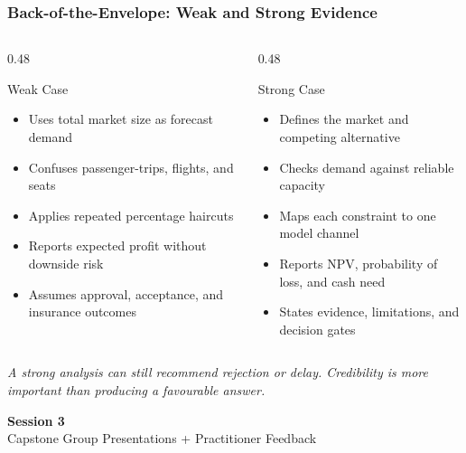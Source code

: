 \documentclass{beamer}
\begin{document}
\begin{frame}[t,shrink=13]
\frametitle{Back-of-the-Envelope: Weak and Strong Evidence}
\begin{columns}[T]
\begin{column}{0.48\textwidth}
\begin{block}{Weak Case}
\begin{itemize}
\item Uses total market size as forecast demand
\item Confuses passenger-trips, flights, and seats
\item Applies repeated percentage haircuts
\item Reports expected profit without downside risk
\item Assumes approval, acceptance, and insurance outcomes
\end{itemize}
\end{block}
\end{column}
\begin{column}{0.48\textwidth}
\begin{block}{Strong Case}
\begin{itemize}
\item Defines the market and competing alternative
\item Checks demand against reliable capacity
\item Maps each constraint to one model channel
\item Reports NPV, probability of loss, and cash need
\item States evidence, limitations, and decision gates
\end{itemize}
\end{block}
\end{column}
\end{columns}
\textit{A strong analysis can still recommend rejection or delay. Credibility is more important than producing a favourable answer.}
\end{frame}

\begin{frame}[c]
  \begin{center}
    \huge\color{cuhkpurple}\textbf{Session 3}\\
    \vspace{0.5cm}
    \Large Capstone Group Presentations + Practitioner Feedback
  \end{center}
\end{frame}
\end{document}
